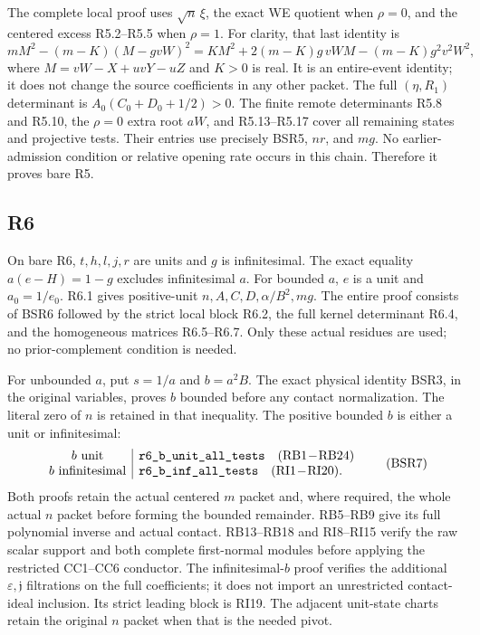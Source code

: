 The complete local proof uses \(\sqrt n\,\xi\), the
exact WE quotient when \(\rho=0\), and the centered
excess R5.2--R5.5 when \(\rho=1\).
For clarity, that last identity is
\[
 mM^2-(m-K)(M-gvW)^2
 =KM^2+2(m-K)g\,vWM-(m-K)g^2v^2W^2,
 \tag{BSR6}
\]
where \(M=vW-X+uvY-uZ\) and \(K>0\) is real.
It is an entire-event identity; it does not change the source
coefficients in any other packet.
The full \((\eta,R_1)\) determinant is
\(A_0(C_0+D_0+1/2)>0\).
The finite remote determinants R5.8 and R5.10, the
\(\rho=0\) extra root \(aW\), and R5.13--R5.17
cover all remaining states and projective tests.
Their entries use precisely BSR5, \(nr\), and \(mg\).
No earlier-admission condition or relative opening rate
occurs in this chain.  Therefore it proves bare R5.

\subsection{R6}

On bare R6, \(t,h,l,j,r\) are units and \(g\) is
infinitesimal.  The exact equality
\(a(e-H)=1-g\) excludes infinitesimal \(a\).
For bounded \(a\), \(e\) is a unit and \(a_0=1/e_0\).
R6.1 gives positive-unit \(n,A,C,D,\alpha/B^2,mg\).
The entire proof consists of BSR6 followed by the strict
local block R6.2, the full kernel determinant R6.4,
and the homogeneous matrices R6.5--R6.7.
Only these actual residues are used; no prior-complement
condition is needed.

For unbounded \(a\), put \(s=1/a\) and \(b=a^2B\).
The exact physical identity BSR3, in the original variables,
proves \(b\) bounded before any contact normalization.
The literal zero of \(n\) is retained in that inequality.
The positive bounded \(b\) is either a unit or infinitesimal:
\[
 \begin{array}{c|l}
 b\text{ unit}&\texttt{r6\_b\_unit\_all\_tests}
                       \quad({\rm RB1\!-\!RB24})\\
 b\text{ infinitesimal}&\texttt{r6\_b\_inf\_all\_tests}
                       \quad({\rm RI1\!-\!RI20}).
 \end{array}
 \tag{BSR7}
\]
Both proofs retain the actual centered \(m\) packet and,
where required, the whole actual \(n\) packet before forming
the bounded remainder.  RB5--RB9 give its full polynomial
inverse and actual contact.  RB13--RB18 and RI8--RI15
verify the raw scalar support and both complete first-normal
modules before applying the restricted CC1--CC6 conductor.
The infinitesimal-\(b\) proof verifies the additional
\(\varepsilon,\mathfrak j\) filtrations on the full coefficients;
it does not import an unrestricted contact-ideal inclusion.
Its strict leading block is RI19.
The adjacent unit-state charts retain the original \(n\)
packet when that is the needed pivot.

